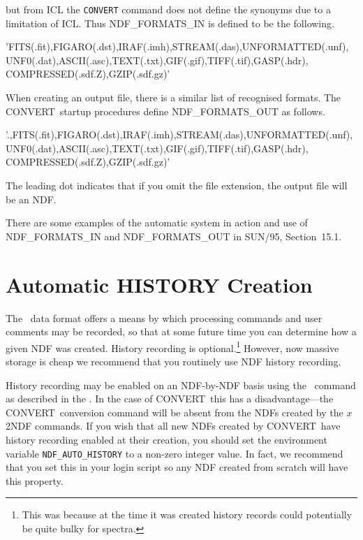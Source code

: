 \documentclass[twoside,11pt]{starlink}
\providecommand{\latexelsehtml}[2]{#1}
\providecommand{\CONVERT}{{\footnotesize CONVERT}}
\providecommand{\KAPPA}{{\footnotesize KAPPA}}
\providecommand{\KAPPAref}{\xref{\KAPPA}{sun95}{}}
\begin{document}
but from ICL the \texttt{CONVERT} command does not define the synonyms due
to a limitation of ICL.  Thus NDF\_FORMATS\_IN is defined to be the
following.

\begin{terminalv}
     'FITS(.fit),FIGARO(.dst),IRAF(.imh),STREAM(.das),UNFORMATTED(.unf),
      UNF0(.dat),ASCII(.asc),TEXT(.txt),GIF(.gif),TIFF(.tif),GASP(.hdr),
      COMPRESSED(.sdf.Z),GZIP(.sdf.gz)'
\end{terminalv}

When creating an output file, there is a similar list of recognised
formats.  The \CONVERT\ startup procedures define NDF\_FORMATS\_OUT
as follows.

\begin{terminalv}
     '.,FITS(.fit),FIGARO(.dst),IRAF(.imh),STREAM(.das),UNFORMATTED(.unf),
     UNF0(.dat),ASCII(.asc),TEXT(.txt),GIF(.gif),TIFF(.tif),GASP(.hdr),
     COMPRESSED(.sdf.Z),GZIP(.sdf.gz)'
\end{terminalv}

The leading dot indicates that if you omit the file extension, the
output file will be an NDF.

There are some examples of the automatic system in action and use of
NDF\_FORMATS\_IN and NDF\_FORMATS\_OUT in
\latexelsehtml{SUN/95, Section~15.1.}{\xref{Automatic
Conversion.}{sun95}{se_autoconvert}}


\section{\label{sect_history}Automatic HISTORY
Creation}

The \ data format offers a
means by which processing commands and user comments may be recorded,
so that at some future time you can determine how a given NDF was
created.  History recording is optional.\footnote{This was because at
the time it was created history records could potentially be quite bulky
for spectra.} However, now massive storage is cheap we recommend that
you routinely use NDF history recording.

History recording may be enabled on an NDF-by-NDF basis using the
\KAPPAref\ command  as described in the
.  In the
case of \CONVERT\ this has a disadvantage---the \CONVERT\ conversion
command will be absent from the NDFs created by the $x$2NDF commands.
If you wish that all new NDFs created by \CONVERT\ have history
recording enabled at their creation, you should set the environment
variable {\tt NDF\_AUTO\_HISTORY} to a non-zero integer value.  In
fact, we recommend that you set this in your login script so any NDF
created from scratch will have this property.
\end{document}

